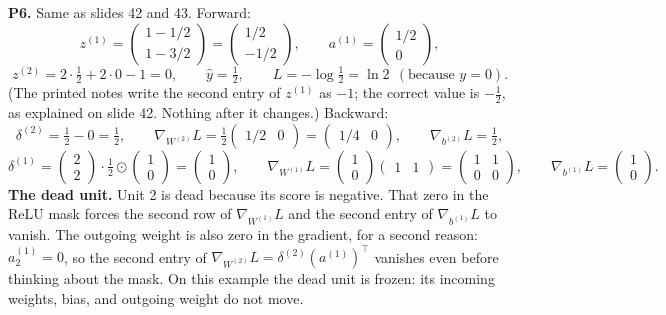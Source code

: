 \textbf{P6.} Same as slides 42 and 43. Forward:
\[
z^{(1)}=\begin{pmatrix}1-1/2\\1-3/2\end{pmatrix}=\begin{pmatrix}1/2\\-1/2\end{pmatrix}, \qquad a^{(1)}=\begin{pmatrix}1/2\\0\end{pmatrix},
\]
\[
z^{(2)}=2\cdot\tfrac12+2\cdot0-1=0, \qquad \hat{y}=\tfrac12, \qquad L=-\log\tfrac12=\ln2 \ \ (\text{because }y=0).
\]
(The printed notes write the second entry of $z^{(1)}$ as $-1$; the correct value is $-\tfrac12$, as explained on slide 42. Nothing after it changes.) Backward:
\[
\delta^{(2)}=\tfrac12-0=\tfrac12, \qquad \nabla_{W^{(2)}}L=\tfrac12\begin{pmatrix}1/2&0\end{pmatrix}=\begin{pmatrix}1/4&0\end{pmatrix}, \qquad \nabla_{b^{(2)}}L=\tfrac12,
\]
\[
\delta^{(1)}=\begin{pmatrix}2\\2\end{pmatrix}\cdot\tfrac12\odot\begin{pmatrix}1\\0\end{pmatrix}=\begin{pmatrix}1\\0\end{pmatrix}, \qquad \nabla_{W^{(1)}}L=\begin{pmatrix}1\\0\end{pmatrix}\begin{pmatrix}1&1\end{pmatrix}=\begin{pmatrix}1&1\\0&0\end{pmatrix}, \qquad \nabla_{b^{(1)}}L=\begin{pmatrix}1\\0\end{pmatrix}.
\]
\textbf{The dead unit.} Unit 2 is dead because its score is negative. That zero in the ReLU mask forces the second row of $\nabla_{W^{(1)}}L$ and the second entry of $\nabla_{b^{(1)}}L$ to vanish. The outgoing weight is also zero in the gradient, for a second reason: $a^{(1)}_2=0$, so the second entry of $\nabla_{W^{(2)}}L=\delta^{(2)}(a^{(1)})^\top$ vanishes even before thinking about the mask. On this example the dead unit is frozen: its incoming weights, bias, and outgoing weight do not move.


